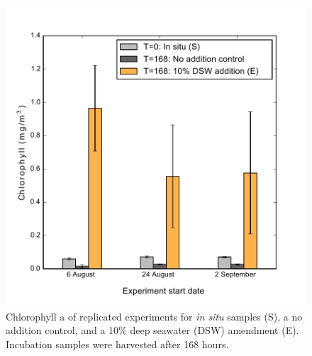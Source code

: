 \begin{figure}[h!]
  \centering
    \includegraphics[width=1\textwidth]{Images/C4_FigureS1.pdf}
    \caption[Chlorophyll a of replicated experiments for \emph{in situ} samples, no addition control, and a 10\% deep seawater amendment]{Chlorophyll a of replicated experiments for \emph{in situ} samples (S), a no addition control, and a 10\% deep seawater (DSW) amendment (E). Incubation samples were harvested after 168 hours.}
  \label{fig:a4f1}
\end{figure}



